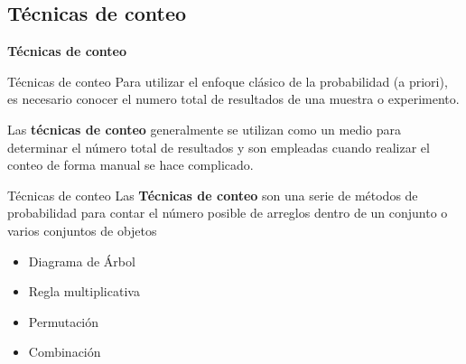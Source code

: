 \documentclass[11pt]{beamer}
\begin{document}
      \subsection*{Técnicas de conteo}

        \begin{frame}{}
           \begin{center}
               \textbf{\huge Técnicas de conteo}
           \end{center}
        \end{frame}

        \begin{frame}{Técnicas de conteo}
            Para utilizar el enfoque clásico de la probabilidad (a priori), es necesario conocer el numero total de resultados de una muestra o experimento.

            Las \textbf{técnicas de conteo} generalmente se utilizan como un medio para determinar el número total de resultados y son empleadas cuando realizar el conteo de forma manual se hace complicado.
            \pause
            \begin{block}{Técnicas de conteo}
                Las \textbf{Técnicas de conteo} son una serie de métodos de probabilidad para contar el número posible de arreglos dentro de un conjunto o varios conjuntos de objetos
            \end{block}
            \begin{itemize}
                \item Diagrama de Árbol
                \item Regla multiplicativa
                \item Permutación
                \item Combinación
            \end{itemize}
        \end{frame}
\end{document}
